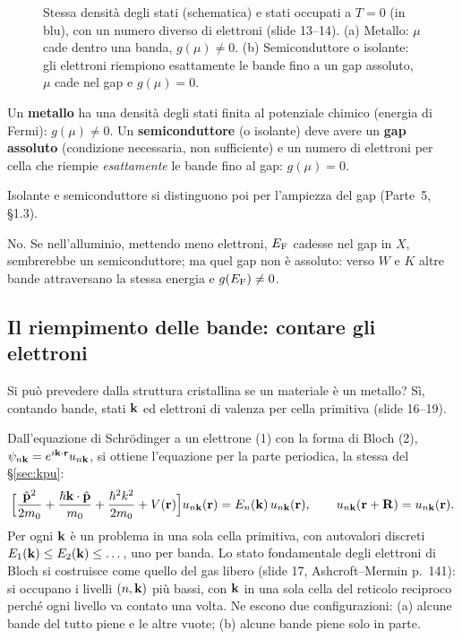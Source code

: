 \documentclass[11pt,a4paper]{article}
\begin{document}
\begin{figure}[tbp]
\centering
{}
\caption{Stessa densità degli stati (schematica) e stati occupati a $T=0$ (in blu), con un numero diverso di elettroni (slide 13--14). (a) Metallo:
$\mu$ cade dentro una banda, $g(\mu)\ne0$. (b) Semiconduttore o isolante: gli elettroni riempiono esattamente le bande fino a un gap assoluto, $\mu$
cade nel gap e $g(\mu)=0$.}\label{fig:dos}
\end{figure}

\begin{definizione}
Un \textbf{metallo} ha una densità degli stati finita al potenziale chimico (energia di Fermi): $g(\mu)\ne0$. Un \textbf{semiconduttore} (o
isolante) deve avere un \textbf{gap assoluto} (condizione necessaria, non sufficiente) e un numero di elettroni per cella che riempie
\emph{esattamente} le bande fino al gap: $g(\mu)=0$.
\end{definizione}
Isolante e semiconduttore si distinguono poi per l'ampiezza del gap (Parte~5, §1.3).

No. Se nell'alluminio, mettendo meno elettroni, $E_{\mathrm F}$ cadesse nel gap in $X$, sembrerebbe un semiconduttore; ma quel gap non è assoluto: verso $W$ e $K$
altre bande attraversano la stessa energia e $g(E_{\mathrm F})\ne0$.

\subsection{Il riempimento delle bande: contare gli elettroni}\label{sec:riempimento}
Si può prevedere dalla struttura cristallina se un materiale è un metallo? Sì, contando bande, stati $\mathbf k$ ed elettroni di valenza per cella
primitiva (slide 16--19).

Dall'equazione di Schrödinger a un elettrone (1) con la forma di Bloch (2), $\psi_{n\mathbf k}=e^{i\mathbf k\cdot\mathbf r}u_{n\mathbf k}$, si ottiene l'equazione per la
parte periodica, la stessa del §\ref{sec:kpu}:
\[
\Bigl[\frac{\hat{\mathbf p}^2}{2m_0}+\frac{\hbar\mathbf k\cdot\hat{\mathbf p}}{m_0}+\frac{\hbar^2k^2}{2m_0}+V(\mathbf r)\Bigr]u_{n\mathbf k}(\mathbf r)=E_n(\mathbf k)\,u_{n\mathbf k}(\mathbf r),\qquad
u_{n\mathbf k}(\mathbf r+\mathbf R)=u_{n\mathbf k}(\mathbf r).
\]
Per ogni $\mathbf k$ è un problema in una sola cella primitiva, con autovalori discreti $E_1(\mathbf k)\le E_2(\mathbf k)\le\dots$, uno per banda. Lo stato
fondamentale degli elettroni di Bloch si costruisce come quello del gas libero (slide 17, Ashcroft--Mermin p.~141): si occupano i livelli $(n,\mathbf k)$
più bassi, con $\mathbf k$ in una sola cella del reticolo reciproco perché ogni livello va contato una volta. Ne escono due configurazioni: (a) alcune bande
del tutto piene e le altre vuote; (b) alcune bande piene solo in parte.
\end{document}
